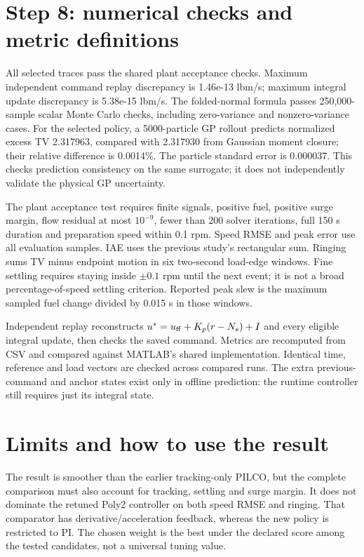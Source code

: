 \documentclass[11pt,a4paper]{article}
\begin{document}
\section{Step 8: numerical checks and metric definitions}
All selected traces pass the shared plant acceptance checks. Maximum independent command replay discrepancy is 1.46e-13 lbm/s; maximum integral update discrepancy is 5.38e-15 lbm/s. The folded-normal formula passes 250,000-sample scalar Monte Carlo checks, including zero-variance and nonzero-variance cases. For the selected policy, a 5000-particle GP rollout predicts normalized excess TV 2.317963, compared with 2.317930 from Gaussian moment closure; their relative difference is 0.0014\%. The particle standard error is 0.000037. This checks prediction consistency on the same surrogate; it does not independently validate the physical GP uncertainty.

The plant acceptance test requires finite signals, positive fuel, positive surge margin, flow residual at most $10^{-9}$, fewer than 200 solver iterations, full 150 s duration and preparation speed within 0.1 rpm. Speed RMSE and peak error use all evaluation samples. IAE uses the previous study's rectangular sum. Ringing sums TV minus endpoint motion in six two-second load-edge windows. Fine settling requires staying inside $\pm0.1$ rpm until the next event; it is not a broad percentage-of-speed settling criterion. Reported peak slew is the maximum sampled fuel change divided by 0.015 s in those windows.

Independent replay reconstructs $u^*=u_{\rm ff}+K_p(r-N_s)+I$ and every eligible integral update, then checks the saved command. Metrics are recomputed from CSV and compared against MATLAB's shared implementation. Identical time, reference and load vectors are checked across compared runs. The extra previous-command and anchor states exist only in offline prediction: the runtime controller still requires just its integral state.

\section{Limits and how to use the result}
The result is smoother than the earlier tracking-only PILCO, but the complete comparison must also account for tracking, settling and surge margin. It does not dominate the retuned Poly2 controller on both speed RMSE and ringing. That comparator has derivative/acceleration feedback, whereas the new policy is restricted to PI. The chosen weight is the best under the declared score among the tested candidates, not a universal tuning value.
\end{document}
